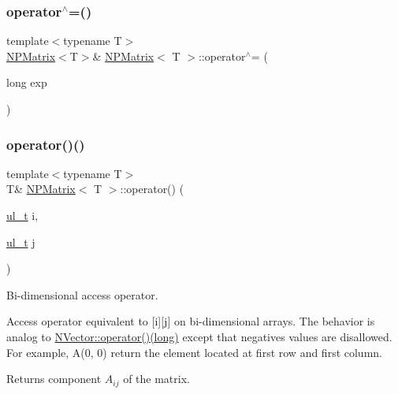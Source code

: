 \subsubsection{\texorpdfstring{operator$^\wedge$=()}{operator^=()}}
{\footnotesize\ttfamily template$<$typename T$>$ \\
\mbox{\hyperlink{class_n_p_matrix}{N\+P\+Matrix}}$<$T$>$\& \mbox{\hyperlink{class_n_p_matrix}{N\+P\+Matrix}}$<$ T $>$\+::operator$^\wedge$= (\begin{DoxyParamCaption}\item[{long}]{exp }\end{DoxyParamCaption})\hspace{0.3cm}{\ttfamily [inline]}}

\mbox{\label{class_n_p_matrix_a437ba12a96e979b50f6d579400b20f6f}} 
\subsubsection{\texorpdfstring{operator()()}{operator()()}\hspace{0.1cm}{\footnotesize\ttfamily [1/4]}}
{\footnotesize\ttfamily template$<$typename T$>$ \\
T\& \mbox{\hyperlink{class_n_p_matrix}{N\+P\+Matrix}}$<$ T $>$\+::operator() (\begin{DoxyParamCaption}\item[{\mbox{\hyperlink{group___n_algebra_ga1b140a2034db3f5dfe18a987745df43a}{ul\+\_\+t}}}]{i,  }\item[{\mbox{\hyperlink{group___n_algebra_ga1b140a2034db3f5dfe18a987745df43a}{ul\+\_\+t}}}]{j }\end{DoxyParamCaption})\hspace{0.3cm}{\ttfamily [inline]}}



Bi-\/dimensional access operator. 

Access operator equivalent to {\ttfamily \mbox{[}i\mbox{]}\mbox{[}j\mbox{]}} on bi-\/dimensional arrays. The behavior is analog to {\ttfamily \mbox{\hyperlink{class_n_vector_a3ed21b63fd97af9c63bfacb372f733a5}{N\+Vector\+::operator()(long)}}} except that negatives values are disallowed. For example, {\ttfamily A(0, 0)} return the element located at first row and first column. \begin{DoxyReturn}{Returns}
component $ A_{ij} $ of the matrix. 
\end{DoxyReturn}
\mbox{\label{class_n_p_matrix_aa512abe782fac9e6b0d2eb1167df4133}} 
